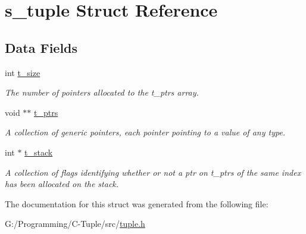 \hypertarget{structs__tuple}{}\section{s\+\_\+tuple Struct Reference}
\label{structs__tuple}
\subsection*{Data Fields}
\begin{DoxyCompactItemize}
\item 
int \hyperlink{structs__tuple_a6b4b94c32d5387510174e59164ad07ef}{t\+\_\+size}\hypertarget{structs__tuple_a6b4b94c32d5387510174e59164ad07ef}{}\label{structs__tuple_a6b4b94c32d5387510174e59164ad07ef}

\begin{DoxyCompactList}\small\item\em The number of pointers allocated to the t\+\_\+ptrs array. \end{DoxyCompactList}\item 
void $\ast$$\ast$ \hyperlink{structs__tuple_a8df2b0dddda0145a22aca089a37ce802}{t\+\_\+ptrs}\hypertarget{structs__tuple_a8df2b0dddda0145a22aca089a37ce802}{}\label{structs__tuple_a8df2b0dddda0145a22aca089a37ce802}

\begin{DoxyCompactList}\small\item\em A collection of generic pointers, each pointer pointing to a value of any type. \end{DoxyCompactList}\item 
int $\ast$ \hyperlink{structs__tuple_ab4205b47ddc4a5a0c6aa4666ce4d9ea1}{t\+\_\+stack}\hypertarget{structs__tuple_ab4205b47ddc4a5a0c6aa4666ce4d9ea1}{}\label{structs__tuple_ab4205b47ddc4a5a0c6aa4666ce4d9ea1}

\begin{DoxyCompactList}\small\item\em A collection of flags identifying whether or not a ptr on t\+\_\+ptrs of the same index has been allocated on the stack. \end{DoxyCompactList}\end{DoxyCompactItemize}


The documentation for this struct was generated from the following file\+:\begin{DoxyCompactItemize}
\item 
G\+:/\+Programming/\+C-\/\+Tuple/src/\hyperlink{tuple_8h}{tuple.\+h}\end{DoxyCompactItemize}
